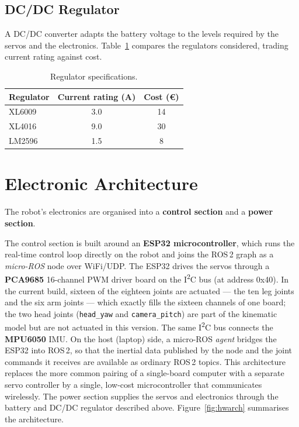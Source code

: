 \subsection{DC/DC Regulator}
A DC/DC converter adapts the battery voltage to the levels required by
the servos and the electronics. Table~\ref{tab:regulator} compares the
regulators considered, trading current rating against cost.

\begin{table}[ht]
  \centering
  \caption{Regulator specifications.}
  \label{tab:regulator}
  \small
  \renewcommand{\arraystretch}{1.2}
  \begin{tabular}{@{}lcc@{}}
    \toprule
    \textbf{Regulator} & \textbf{Current rating (A)} & \textbf{Cost (\euro)} \\
    \midrule
    XL6009 & 3.0 & 14 \\
    XL4016 & 9.0 & 30 \\
    LM2596 & 1.5 & 8  \\
    \bottomrule
  \end{tabular}
\end{table}

\section{Electronic Architecture}
\label{sec:hw-arch}
The robot's electronics are organised into a \textbf{control section} and
a \textbf{power section}.

The control section is built around an \textbf{ESP32 microcontroller},
which runs the real-time control loop directly on the robot and joins the
ROS\,2 graph as a \emph{micro-ROS} node over WiFi/UDP. The ESP32 drives
the servos through a \textbf{PCA9685} 16-channel PWM driver board on the
I\textsuperscript{2}C bus (at address 0x40). In the current build,
sixteen of the eighteen joints are actuated --- the ten leg joints and
the six arm joints --- which exactly fills the sixteen channels of one
board; the two head joints (\texttt{head\_yaw} and \texttt{camera\_pitch})
are part of the kinematic model but are not actuated in this version. The
same I\textsuperscript{2}C bus connects the \textbf{MPU6050} IMU. On the
host (laptop) side, a micro-ROS \emph{agent}
bridges the ESP32 into ROS\,2, so that the inertial data published by the
node and the joint commands it receives are available as ordinary ROS\,2
topics. This architecture replaces the more common pairing of a
single-board computer with a separate servo controller by a single,
low-cost microcontroller that communicates wirelessly. The power section
supplies the servos and electronics through the battery and DC/DC
regulator described above. Figure~\ref{fig:hwarch} summarises the
architecture.

